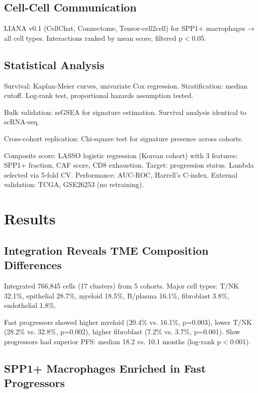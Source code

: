 \documentclass[12pt,twoside]{article}
\begin{document}
\subsection{Cell-Cell Communication}

LIANA v0.1 (CellChat, Connectome, Tensor-cell2cell) for SPP1+ macrophages → all cell types. Interactions ranked by mean score, filtered p$<$0.05.

\subsection{Statistical Analysis}

Survival: Kaplan-Meier curves, univariate Cox regression. Stratification: median cutoff. Log-rank test, proportional hazards assumption tested.

Bulk validation: ssGSEA for signature estimation. Survival analysis identical to scRNA-seq.

Cross-cohort replication: Chi-square test for signature presence across cohorts.

Composite score: LASSO logistic regression (Korean cohort) with 3 features: SPP1+ fraction, CAF score, CD8 exhaustion. Target: progression status. Lambda selected via 5-fold CV. Performance: AUC-ROC, Harrell's C-index. External validation: TCGA, GSE26253 (no retraining).

\section{Results}

\subsection{Integration Reveals TME Composition Differences}

Integrated 766,845 cells (17 clusters) from 5 cohorts. Major cell types: T/NK 32.1\%, epithelial 28.7\%, myeloid 18.5\%, B/plasma 16.1\%, fibroblast 3.8\%, endothelial 1.8\%.

Fast progressors showed higher myeloid (20.4\% vs. 16.1\%, p=0.003), lower T/NK (28.2\% vs. 32.8\%, p=0.002), higher fibroblast (7.2\% vs. 3.7\%, p=0.001). Slow progressors had superior PFS: median 18.2 vs. 10.1 months (log-rank p$<$0.001).

\subsection{SPP1+ Macrophages Enriched in Fast Progressors}
\end{document}
